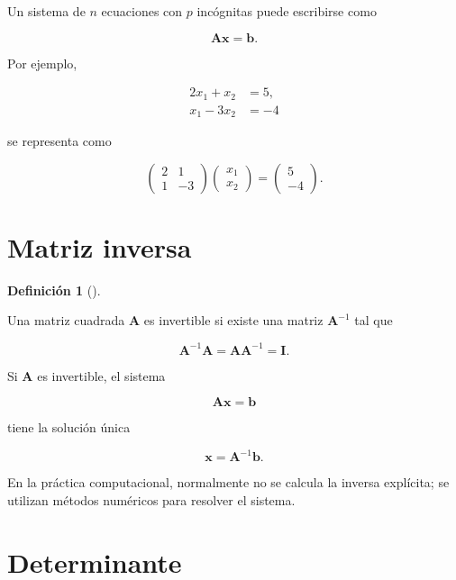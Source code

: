 \documentclass[
  spanish,
  10.5pt,
  letterpaper,
  DIV=11,
  numbers=noendperiod,
  oneside,
  open=any]{scrreprt}
\theoremstyle{definition}
\newtheorem{definition}{Definición}[chapter]
\theoremstyle{definition}
\theoremstyle{plain}
\theoremstyle{remark}
\begin{document}

Un sistema de \(n\) ecuaciones con \(p\) incógnitas puede escribirse
como

\[
\mathbf{A}\mathbf{x}
=
\mathbf{b}.
\]

Por ejemplo,

\[
\begin{aligned}
2x_1+x_2&=5,\\
x_1-3x_2&=-4
\end{aligned}
\]

se representa como

\[
\begin{pmatrix}
2 & 1\\
1 & -3
\end{pmatrix}
\begin{pmatrix}
x_1\\
x_2
\end{pmatrix}
=
\begin{pmatrix}
5\\
-4
\end{pmatrix}.
\]

\section*{Matriz inversa}\label{matriz-inversa}


\begin{definition}[]\protect\hypertarget{def-matriz-inversa}{}\label{def-matriz-inversa}

Una matriz cuadrada \(\mathbf{A}\) es invertible si existe una matriz
\(\mathbf{A}^{-1}\) tal que

\[
\mathbf{A}^{-1}\mathbf{A}
=
\mathbf{A}\mathbf{A}^{-1}
=
\mathbf{I}.
\]

\end{definition}

Si \(\mathbf{A}\) es invertible, el sistema

\[
\mathbf{A}\mathbf{x}=\mathbf{b}
\]

tiene la solución única

\[
\mathbf{x}
=
\mathbf{A}^{-1}\mathbf{b}.
\]

En la práctica computacional, normalmente no se calcula la inversa
explícita; se utilizan métodos numéricos para resolver el sistema.

\section*{Determinante}\label{determinante}
\end{document}
